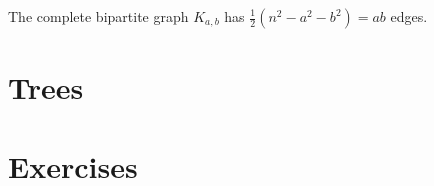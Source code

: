 \documentclass[nobib]{tufte-handout}
\begin{document}
\begin{corollary}
  The complete bipartite graph $K_{a,b}$ has $\frac{1}{2}\left(n^2 - a^2 - b^2\right) = ab$ edges.
\end{corollary}

\section{Trees}

\section{Exercises}

%
%
\end{document}
